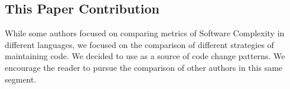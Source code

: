 \subsection{This Paper Contribution}

While some authors focused on comparing metrics of Software Complexity in different languages, we focused on the comparison
of different strategies of maintaining code. We decided to use \cite{book:refactoring} as a source of code change patterns.
We encourage the reader to pursue the comparison of other authors in this same segment.
